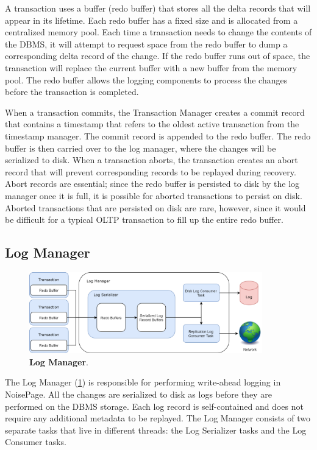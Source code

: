 \documentclass[12pt]{cmuthesis}
\begin{document}
A transaction uses a buffer (redo buffer) that stores all the delta records that will appear in its lifetime. Each redo buffer has a fixed size and is allocated from a centralized memory pool. Each time a transaction needs to change the contents of the DBMS, it will attempt to request space from the redo buffer to dump a corresponding delta record of the change. If the redo buffer runs out of space, the transaction will replace the current buffer with a new buffer from the memory pool. The redo buffer allows the logging components to process the changes before the transaction is completed.

When a transaction commits, the Transaction Manager creates a commit record that contains a timestamp that refers to the oldest active transaction from the timestamp manager. The commit record is appended to the redo buffer. The redo buffer is then carried over to the log manager, where the changes will be serialized to disk. When a transaction aborts, the transaction creates an abort record that will prevent corresponding records to be replayed during recovery. Abort records are essential; since the redo buffer is persisted to disk by the log manager once it is full, it is possible for aborted transactions to persist on disk. Aborted transactions that are persisted on disk are rare, however, since it would be difficult for a typical OLTP transaction to fill up the entire redo buffer.

\subsection{Log Manager}
\begin{figure}[t!]
\centering
\includegraphics[width=0.9\textwidth]{images/WAL.png}
\caption{\textbf{Log Manager}.}
\label{fig:log_manager}
\end{figure}

The Log Manager (\cref{fig:log_manager}) is responsible for performing write-ahead logging in NoisePage. All the changes are serialized to disk as logs before they are performed on the DBMS storage. Each log record is self-contained and does not require any additional metadata to be replayed. The Log Manager consists of two separate tasks that live in different threads: the Log Serializer tasks and the Log Consumer tasks.
\end{document}
